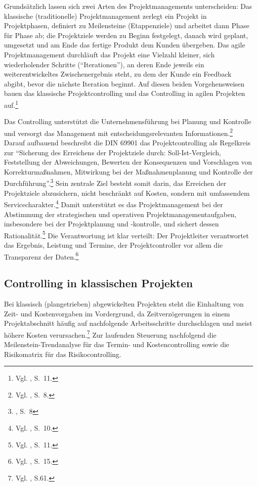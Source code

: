 \documentclass[
    12pt, 
    a4paper,
    ]{scrartcl} %
\begin{document}
Grundsätzlich lassen sich zwei Arten des Projektmanagements unterscheiden: Das klassische (traditionelle) Projektmanagement zerlegt ein Projekt in Projektphasen, definiert zu Meilensteine (Etappenziele) und arbeitet dann Phase für Phase ab; die Projektziele werden zu Beginn festgelegt, danach wird geplant, umgesetzt und am Ende das fertige Produkt dem Kunden übergeben. Das agile Projektmanagement durchläuft das Projekt eine Vielzahl kleiner, sich wiederholender Schritte (\enquote{Iterationen}), an deren Ende jeweils ein weiterentwickeltes Zwischenergebnis steht, zu dem der Kunde ein Feedback abgibt, bevor die nächste Iteration beginnt. Auf diesen beiden Vorgehensweisen bauen das klassische Projektcontrolling und das Controlling in agilen Projekten auf.\footnote{Vgl. \cite{Beiderwieden_ProjektmanagementIT}, S.~11.}

Das Controlling unterstützt die Unternehmensführung bei Planung und Kontrolle und versorgt das Management mit entscheidungsrelevanten Informationen.\footnote{Vgl. \cite{Feidler_ControllingVonProjekten}, S.~8.} Darauf aufbauend beschreibt die DIN 69901 das Projektcontrolling als Regelkreis zur \enquote{Sicherung des Erreichens der Projektziele durch: Soll-Ist-Vergleich, Feststellung der Abweichungen, Bewerten der Konsequenzen und Vorschlagen von Korrekturmaßnahmen, Mitwirkung bei der Maßnahmenplanung und Kontrolle der Durchführung}.\footnote{\cite{Feidler_ControllingVonProjekten}, S.~8} Sein zentrale Ziel besteht somit darin, das Erreichen der Projektziele abzusichern, nicht beschränkt auf Kosten, sondern mit umfassendem Servicecharakter.\footnote{Vgl. \cite{Feidler_ControllingVonProjekten}, S.~10.} Damit unterstützt es das Projektmanagement bei der Abstimmung der strategischen und operativen Projektmanagementaufgaben, insbesondere bei der Projektplanung und -kontrolle, und sichert dessen Rationalität.\footnote{Vgl. \cite{Feidler_ControllingVonProjekten}, S.~11.} Die Verantwortung ist klar verteilt: Der Projektleiter verantwortet das Ergebnis, Leistung und Termine, der Projektcontroller vor allem die Transparenz der Daten.\footnote{Vgl. \cite{Feidler_ControllingVonProjekten}, S.~15.}

\subsection{Controlling in klassischen Projekten}

Bei klassisch (plangetrieben) abgewickelten Projekten steht die Einhaltung von Zeit- und Kostenvorgaben im Vordergrund, da Zeitverzögerungen in einem Projektabschnitt häufig auf nachfolgende Arbeitsschritte durchschlagen und meist höhere Kosten verursachen.\footnote{Vgl. \cite{Nobach_Projektcontrolling}, S.61.} Zur laufenden Steuerung nachfolgend die Meilenstein-Trendanalyse für das Termin- und Kostencontrolling sowie die Risikomatrix für das Risikocontrolling.
\end{document}
